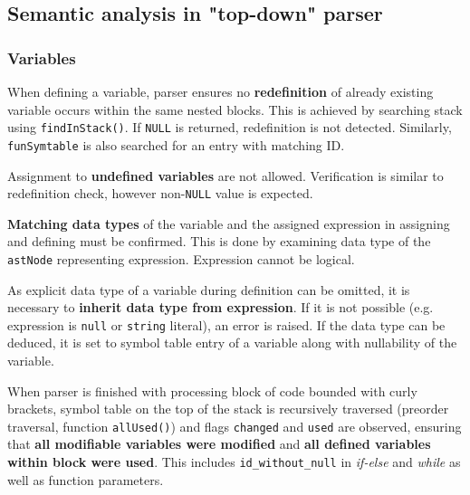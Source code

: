 \documentclass[a4paper, 11pt]{article}
\begin{document}
\subsection{Semantic analysis in "top-down" parser}
\subsubsection{Variables}
When defining a variable, parser ensures no \textbf{redefinition} of already
existing variable occurs within the same nested blocks. This is achieved by searching stack using
\verb|findInStack()|. If \verb|NULL| is returned, redefinition is not detected. Similarly,
\verb|funSymtable| is also searched for an entry with matching ID.
\par Assignment to \textbf{undefined variables} are not allowed. Verification is similar to redefinition check,
however non-\verb|NULL| value is expected.
\par \textbf{Matching data types} of the variable and the assigned expression in assigning and defining must be confirmed.
This is done by examining data type of the \verb|astNode| representing expression. Expression cannot be logical.
\par As explicit data type of a variable during definition can be omitted, it is necessary to \textbf{inherit data type
from expression}. If it is not possible (e.g. expression is \verb|null| or \verb|string| literal), an error is raised.
If the data type can be deduced, it is set to symbol table entry of a variable along with nullability of the variable.
\par When parser is finished with processing block of code bounded with curly brackets, symbol table on the top of the stack
is recursively traversed (preorder traversal, function \verb|allUsed()|) and flags \verb|changed| and \verb|used| are observed,
ensuring that \textbf{all modifiable variables were modified} and \textbf{all defined variables within block were used}. This includes
\verb|id_without_null| in \textit{if-else} and \textit{while} as well as function parameters.
\end{document}
